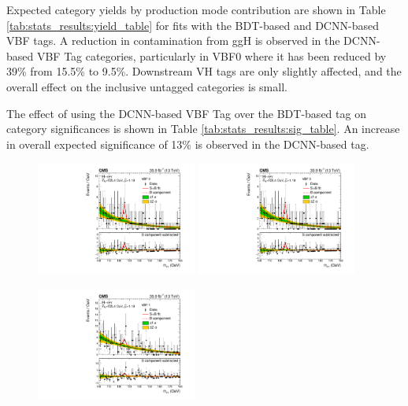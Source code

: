 Expected category yields by production mode contribution are shown in Table \ref{tab:stats_results:yield_table} for fits with the BDT-based and DCNN-based VBF tags. 
A reduction in contamination from ggH is observed in the DCNN-based VBF Tag categories, particularly in VBF0 where it has been reduced by 39\% from 15.5\% to 9.5\%. 
Downstream VH tags are only slightly affected, and the overall effect on the inclusive untagged categories is small. 

The effect of using the DCNN-based VBF Tag over the BDT-based tag on category significances is shown in Table \ref{tab:stats_results:sig_table}.
An increase in overall expected significance of 13\% is observed in the DCNN-based tag. 
\newpage
\begin{figure}[h!]
    \begin{center}
        \includegraphics[width=0.47\textwidth]{figures/stats_results/CMS-HIG-16-040_Figure_012-a.pdf}
        \includegraphics[width=0.47\textwidth]{figures/stats_results/CMS-HIG-16-040_Figure_012-a.pdf}
    \end{center}
    \begin{center}
        \includegraphics[width=0.47\textwidth]{figures/stats_results/CMS-HIG-16-040_Figure_012-b.pdf}

\end{center}
\end{figure}
